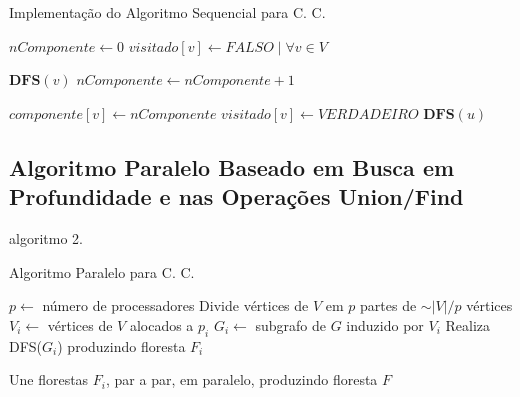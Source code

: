 \documentclass[12pt]{article}
\begin{document}
\begin{algorithm}
    \DontPrintSemicolon
    \caption{Implementação do Algoritmo Sequencial para C. C.}
	{
        $nComponente \gets 0$\;
        $visitado[v] \gets FALSO \mid \forall v \in V$\;
    
        {
            {
                $\textbf{DFS}(v)$\;
                $nComponente \gets nComponente + 1$\;
            }
        }
    }
    
    {
        $componente[v] \gets nComponente$\; 
        $visitado[v] \gets VERDADEIRO$\;
        {
            {
                $\textbf{DFS}(u)$\;
            }
        }
    }
\end{algorithm}

\subsection{Algoritmo Paralelo Baseado em Busca em Profundidade e nas Operações Union/Find}

algoritmo 2.

\begin{algorithm}
    \DontPrintSemicolon
    \caption{Algoritmo Paralelo para C. C.}
    {
        $p \gets$ número de processadores\;
        Divide vértices de $V$ em $p$ partes de $\sim|V|/p$ vértices\;
        {
            $V_i \gets$ vértices de $V$ alocados a $p_i$\;
            $G_i \gets$ subgrafo de $G$ induzido por $V_i$\;
            Realiza DFS($G_i$) produzindo floresta $F_i$\;
        }

        Une florestas $F_i$, par a par, em paralelo, produzindo floresta $F$\;
        
    }
\end{algorithm}
\end{document}
